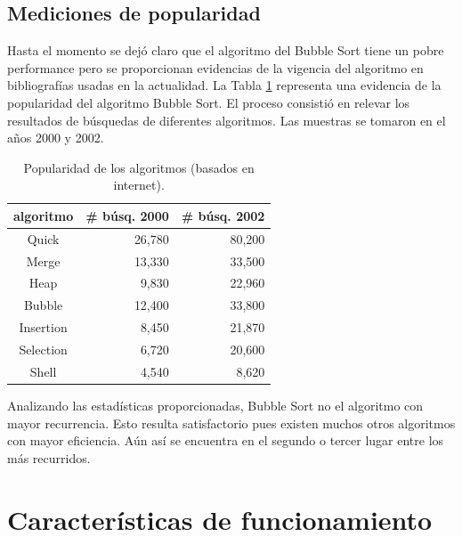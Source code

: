 \documentclass[conference]{IEEEtran}
\begin{document}
\subsection{Mediciones de popularidad}
\label{sec:orig-med-pop}

Hasta el momento se dejó claro que el algoritmo del Bubble Sort tiene
un pobre performance pero se proporcionan evidencias de la vigencia
del algoritmo en bibliografías usadas en la actualidad. La Tabla
\ref{tab:pop} representa una evidencia de la popularidad del algoritmo
Bubble Sort. El proceso consistió en relevar los resultados de
búsquedas de diferentes algoritmos. Las muestras se tomaron en el años
2000 y 2002. 
\begin{table}[ht]
\renewcommand{\arraystretch}{1.3}
\caption{Popularidad de los algoritmos (basados en internet).}
\label{tab:pop}
\centering
\begin{tabular}{|c|r|r|}
\hline
\textbf{algoritmo} & \textbf{\# búsq. 2000} & \textbf{\# búsq. 2002} \\
\hline
Quick     & 26,780 & 80,200 \\
Merge     & 13,330 & 33,500 \\
Heap      & 9,830  & 22,960 \\
Bubble    & 12,400 & 33,800 \\
Insertion & 8,450  & 21,870 \\
Selection & 6,720  & 20,600 \\
Shell     & 4,540  & 8,620  \\
\hline
\end{tabular}
\end{table}

Analizando las estadísticas proporcionadas, Bubble Sort no el
algoritmo con mayor recurrencia. Esto resulta satisfactorio pues
existen muchos otros algoritmos con mayor eficiencia. Aún así se
encuentra en el segundo o tercer lugar entre los más recurridos. 

\section{Características de funcionamiento}
\label{sec:car-func}
\end{document}
